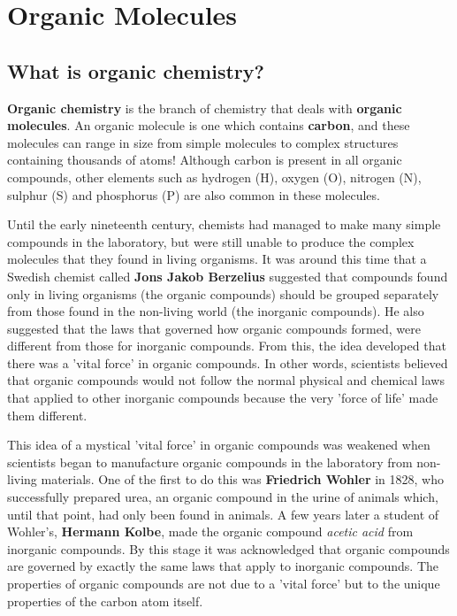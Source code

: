 \chapter{Organic Molecules}
\label{chap:om}




\section{What is organic chemistry?}
\label{sec:om:hist}

\textbf{Organic chemistry} is the branch of chemistry that deals with \textbf{organic molecules}. An organic molecule is one which contains \textbf{carbon}, and these molecules can range in size from simple molecules to complex structures containing thousands of atoms! Although carbon is present in all organic compounds, other elements such as hydrogen (H), oxygen (O), nitrogen (N), sulphur (S) and phosphorus (P) are also common in these molecules.

Until the early nineteenth century, chemists had managed to make many simple compounds in the laboratory, but were still unable to produce the complex molecules that they found in living organisms. It was around this time that a Swedish chemist called \textbf{Jons Jakob Berzelius} suggested that compounds found only in living organisms (the organic compounds) should be grouped separately from those found in the non-living world (the inorganic compounds). He also suggested that the laws that governed how organic compounds formed, were different from those for inorganic compounds. From this, the idea developed that there was a 'vital force' in organic compounds. In other words, scientists believed that organic compounds would not follow the normal physical and chemical laws that applied to other inorganic compounds because the very 'force of life' made them different.

This idea of a mystical 'vital force' in organic compounds was weakened when scientists began to manufacture organic compounds in the laboratory from non-living materials. One of the first to do this was \textbf{Friedrich Wohler} in 1828, who successfully prepared urea, an organic compound in the urine of animals which, until that point, had only been found in animals. A few years later a student of Wohler's, \textbf{Hermann Kolbe}, made the organic compound \textit{acetic acid} from inorganic compounds. By this stage it was acknowledged that organic compounds are governed by exactly the same laws that apply to inorganic compounds. The properties of organic compounds are not due to a 'vital force' but to the unique properties of the carbon atom itself.\\

